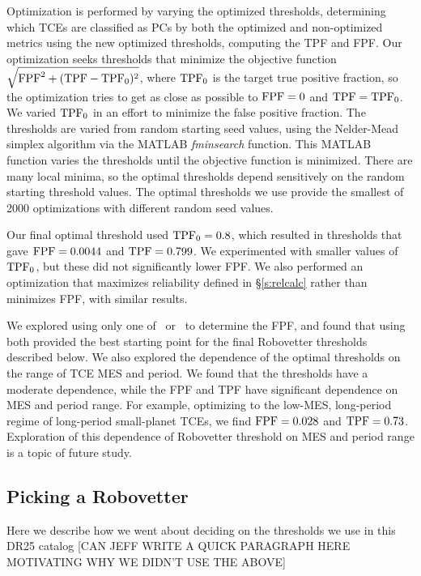 Optimization is performed by varying the optimized thresholds, determining which TCEs are classified as PCs by both the optimized and non-optimized metrics using the new optimized thresholds, computing the TPF and FPF.  Our optimization seeks thresholds that minimize the objective function $\sqrt{{\rm FPF}^2 + ({\rm TPF} - {\rm TPF}_0)^2}$, where ${\rm TPF}_0$ is the target true positive fraction, so the optimization tries to get as close as possible to ${\rm FPF} = 0$ and ${\rm TPF} = {\rm TPF}_0$.  We varied ${\rm TPF}_0$ in an effort to minimize the false positive fraction. The thresholds are varied from random starting seed values, using the Nelder-Mead simplex algorithm via the MATLAB {\it fminsearch} function.  This MATLAB function varies the thresholds until the objective function is minimized.  There are many local minima, so the optimal thresholds depend sensitively on the random starting threshold values.  The optimal thresholds we use provide the smallest  of 2000 optimizations with different random seed values.

Our final optimal threshold used ${\rm TPF}_0 = 0.8$, which resulted in thresholds that gave ${\rm FPF} = 0.0044$ and ${\rm TPF} = 0.799$.  We experimented with smaller values of ${\rm TPF}_0$, but these did not significantly lower FPF.   We also performed an optimization that maximizes reliability defined in \S\ref{s:relcalc} rather than minimizes FPF, with similar results.  

We explored using only one of \scrtce\ or \invtce\ to determine the FPF, and found that using both provided the best starting point for the final Robovetter thresholds described below.  We also explored the dependence of the optimal thresholds on the range of TCE MES and period.  We found that the thresholds have a moderate dependence, while the FPF and TPF have significant dependence on MES and period range.  For example, optimizing to the low-MES, long-period regime of long-period small-planet TCEs,  we find ${\rm FPF} = 0.028$ and ${\rm TPF} = 0.73$.  Exploration of this dependence of Robovetter threshold on MES and period range is a topic of future study.


\subsection{Picking a Robovetter}
Here we describe how we went about deciding on the thresholds we use in this DR25 catalog
[CAN JEFF WRITE A QUICK PARAGRAPH HERE MOTIVATING WHY WE DIDN'T USE THE ABOVE]\\
[DO WE WANT A TABLE OF THE EXACT THRESHOLDS STEVE FOUND?]\\
[MAYBE END WITH the knowledge that people can tune their own robovetter.]
